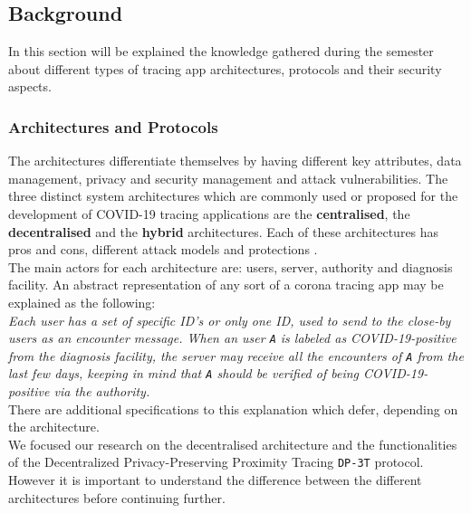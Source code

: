 \documentclass[a4paper, twocolumn]{article}
\begin{document}
\subsection{Background}
In this section will be explained the knowledge gathered during the semester about different types of tracing app architectures, protocols and their security aspects.
\subsubsection{Architectures and Protocols}
The architectures differentiate themselves by having different key attributes, data management, privacy and security management and attack vulnerabilities. The three distinct system architectures which are commonly used or proposed for the development of COVID-19 tracing applications are the  \textbf{centralised}, the \textbf{decentralised} and the \textbf{hybrid} architectures. Each of these architectures has pros and cons, different attack models and protections \cite{survey}.\\
The main actors for each architecture are: users, server, authority and diagnosis facility. An abstract representation of any sort of a corona tracing app may be explained as the following:\\
\textit{Each user has a set of specific ID's or only one ID, used to send to the close-by users as an encounter message. When an user \texttt{A} is labeled as COVID-19-positive from the diagnosis facility, the server may receive all the encounters of \texttt{A} from the last few days, keeping in mind that \texttt{A} should be verified of being COVID-19-positive via the authority.}\\

\noindent There are additional specifications to this explanation which defer, depending on the architecture.\\
We focused our research on the decentralised architecture and the functionalities of the Decentralized Privacy-Preserving Proximity Tracing \texttt{DP-3T} protocol. However it is important to understand the difference between the different architectures before continuing further.\\
\end{document}
